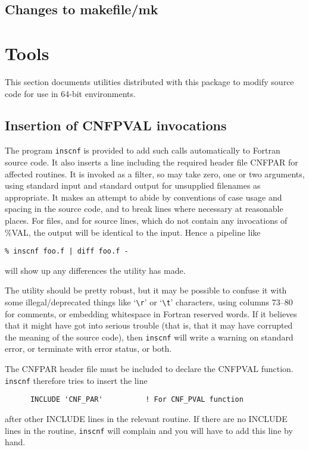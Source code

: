 \documentclass[twoside,11pt]{article}
\renewcommand{\_}{\texttt{\symbol{95}}}
\begin{document}
\subsection{Changes to makefile/mk}





\section{Tools\label{sec:tools}}

This section documents utilities distributed with this package
to modify source code for use in 64-bit environments.

\subsection{Insertion of CNF\_PVAL invocations}


The program {\tt inscnf} is provided to add such calls automatically
to Fortran source code.  
It also inserts a line including the required header file CNF\_PAR for
affected routines.  It is invoked as a filter, so may take zero,
one or two arguments, using standard input and standard output for 
unsupplied filenames as appropriate.  It makes an attempt to abide by
conventions of case usage and spacing in the source code, and to
break lines where necessary at reasonable places.  For files,
and for source lines, which do not contain any invocations of \%VAL, 
the output will be identical to the input.  Hence a pipeline like
\begin{squote}
\begin{verbatim}
% inscnf foo.f | diff foo.f - 
\end{verbatim}
\end{squote}
will show up any differences the utility has made.

The utility should be pretty robust, but it may be possible to
confuse it with some illegal/deprecated things like 
`\verb+\r+' or `\verb+\t+' 
characters, using columns 73--80 for comments, or embedding whitespace
in Fortran reserved words.
If it believes
that it might have got into serious trouble (that is, that it may
have corrupted the meaning of the source code), then {\tt inscnf}
will write a warning on standard error, or terminate with error
status, or both.

The CNF\_PAR header file must be included to declare the CNF\_PVAL
function.  {\tt inscnf} therefore tries to insert the line
\begin{squote}
\begin{verbatim}
      INCLUDE 'CNF_PAR'          ! For CNF_PVAL function
\end{verbatim}
\end{squote}
after  other INCLUDE lines in the relevant routine.  
If there are no INCLUDE lines in the routine, {\tt inscnf} will
complain and you will have to add this line by hand.
\end{document}
